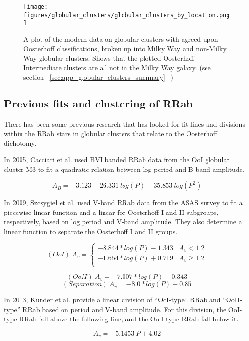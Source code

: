 \documentclass[]{article}
\begin{document}
\begin{figure}
	\centering
	\texttt{[image: figures/globular\_clusters/globular\_clusters\_by\_location.png]}
	\caption{A plot of the modern data on globular clusters with agreed upon Oosterhoff classifications, broken up into Milky Way and non-Milky Way globular clusters. Shows that the plotted Oosterhoff Intermediate clusters are all not in the Milky Way galaxy. (see section ~\ref{sec:app_globular_clusters_summary}~ )}
	\label{fig:modern_globular_clusters_location}
\end{figure}

\subsection{Previous fits and clustering of RRab}
There has been some previous research that has looked for fit lines and divisions within the RRab stars in globular clusters that relate to the Oosterhoff dichotomy.


In 2005, Cacciari et al. used BVI banded RRab data from the OoI globular cluster M3 to fit a quadratic relation between log period and B-band amplitude. \cite{cacciari_2005}

$$
A_{B} = -3.123 - 26.331~log(P) - 35.853~log(P^{2})
$$

In 2009, Szczygie{\l} et al. used V-band RRab data from the ASAS survey to fit a piecewise linear function and a linear for Oosterhoff I and II subgroups, respectively, based on log period and V-band amplitude. They also determine a linear function to separate the Oosterhoff I and II groups. \cite{szczygiel_2009}

$$
(OoI)~A_{v} =
\begin{cases} 
	-8.844 * log(P) - 1.343 & A_{v} < 1.2 \\
	-1.654 * log(P) + 0.719 & A_{v} \geq 1.2 \\
\end{cases}
$$

$$
(OoII)~A_{v} = -7.007 * log(P) - 0.343
$$
$$
(Separation)~A_{v} = -8.0 * log(P) - 0.85
$$

In 2013, Kunder et al. provide a linear division of ``OoI-type'' RRab and ``OoII-type'' RRab based on period and V-band amplitude. For this division, the OoI-type RRab fall above the following line, and the Oo-I-type RRab fall below it. \cite{kunder_2013_d}

$$
A_{v} = -5.1453~P + 4.02
$$

\newpage
\end{document}
